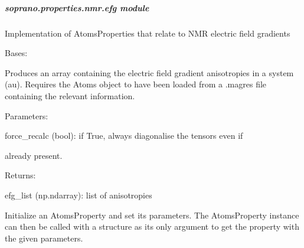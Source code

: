 \documentclass[letterpaper,10pt,english]{sphinxmanual}
\begin{document}
\subparagraph{soprano.properties.nmr.efg module}
\label{doctree/soprano.properties.nmr.efg::doc}\label{doctree/soprano.properties.nmr.efg:module-soprano.properties.nmr.efg}\label{doctree/soprano.properties.nmr.efg:soprano-properties-nmr-efg-module}
Implementation of AtomsProperties that relate to NMR electric field
gradients

\begin{fulllineitems}
\label{doctree/soprano.properties.nmr.efg:soprano.properties.nmr.efg.EFGAnisotropy}
Bases: {\hyperref[doctree/soprano.properties.atomsproperty:soprano.properties.atomsproperty.AtomsProperty]{}}

Produces an array containing the electric field gradient anisotropies in a
system (au).
Requires the Atoms object to have been loaded from a .magres file
containing the relevant information.

\begin{DUlineblock}{0em}
\item[] Parameters:
\item[]
\begin{DUlineblock}{\DUlineblockindent}
\item[] force\_recalc (bool): if True, always diagonalise the tensors even if
\item[]
\begin{DUlineblock}{\DUlineblockindent}
\item[] already present.
\end{DUlineblock}
\end{DUlineblock}
\end{DUlineblock}

\begin{DUlineblock}{0em}
\item[] Returns:
\item[]
\begin{DUlineblock}{\DUlineblockindent}
\item[] efg\_list (np.ndarray): list of anisotropies
\end{DUlineblock}
\end{DUlineblock}

Initialize an AtomsProperty and set its parameters.
The AtomsProperty instance can then be called with a structure as its
only argument to get the property with the given parameters.


\end{fulllineitems}
\end{document}
